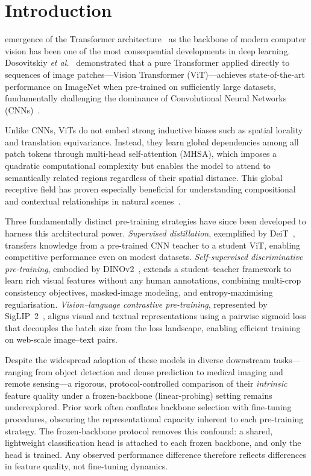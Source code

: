\documentclass[journal]{IEEEtran}
\begin{document}
\section{Introduction}
\label{sec:introduction}

 emergence of the Transformer architecture~\cite{vaswani2017attention} as the
backbone of modern computer vision has been one of the most consequential developments in deep
learning. Dosovitskiy \textit{et al.}~\cite{dosovitskiy2021vit} demonstrated that a pure
Transformer applied directly to sequences of image patches—Vision Transformer (ViT)—achieves
state-of-the-art performance on ImageNet when pre-trained on sufficiently large datasets,
fundamentally challenging the dominance of Convolutional Neural Networks
(CNNs)~\cite{lecun1998gradient, he2016deep, simonyan2015vgg}.

Unlike CNNs, ViTs do not embed strong inductive biases such as spatial locality and translation
equivariance. Instead, they learn global dependencies among all patch tokens through
multi-head self-attention (MHSA), which imposes a quadratic computational complexity but
enables the model to attend to semantically related regions regardless of their spatial distance.
This global receptive field has proven especially beneficial for understanding compositional
and contextual relationships in natural scenes~\cite{liu2021swin}.

Three fundamentally distinct pre-training strategies have since been developed to harness this
architectural power. \textit{Supervised distillation}, exemplified by DeiT~\cite{touvron2021deit},
transfers knowledge from a pre-trained CNN teacher to a student ViT, enabling competitive
performance even on modest datasets. \textit{Self-supervised discriminative pre-training},
embodied by DINOv2~\cite{oquab2023dinov2}, extends a student–teacher framework to learn rich
visual features without any human annotations, combining multi-crop consistency objectives,
masked-image modeling, and entropy-maximising regularisation. \textit{Vision–language contrastive
pre-training}, represented by SigLIP~2~\cite{tschannen2025siglip2}, aligns visual and textual
representations using a pairwise sigmoid loss that decouples the batch size from the loss
landscape, enabling efficient training on web-scale image–text pairs.

Despite the widespread adoption of these models in diverse downstream tasks—ranging from
object detection and dense prediction to medical imaging and remote sensing—a rigorous,
protocol-controlled comparison of their \emph{intrinsic} feature quality under a frozen-backbone
(linear-probing) setting remains underexplored. Prior work often conflates backbone selection
with fine-tuning procedures, obscuring the representational capacity inherent to each pre-training
strategy. The frozen-backbone protocol removes this confound: a shared, lightweight classification
head is attached to each frozen backbone, and only the head is trained. Any observed performance
difference therefore reflects differences in feature quality, not fine-tuning dynamics.
\end{document}
